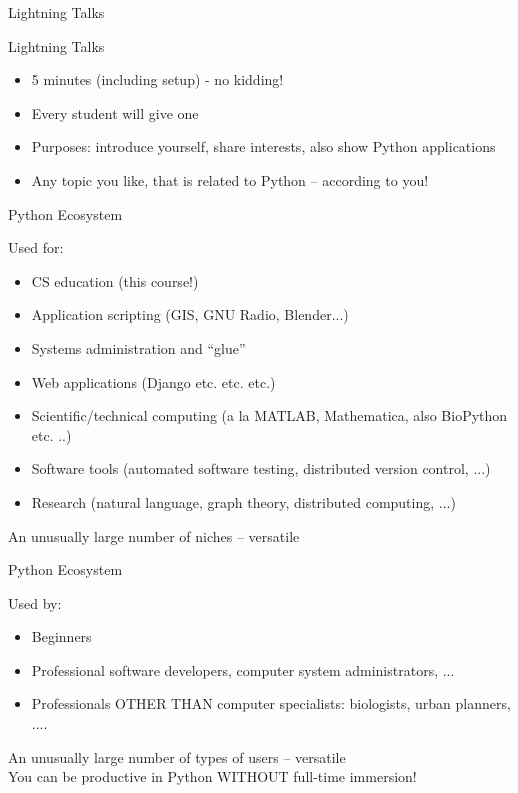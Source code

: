 \documentclass{beamer}
\begin{document}
\begin{frame}{Lightning Talks}

{\Large Lightning Talks}
\begin{itemize}
   \item 5 minutes (including setup) - no kidding!
   \item Every student will give one
   \item Purposes: introduce yourself, share interests, also show Python applications
   \item Any topic you like, that is related to Python -- according to you!
\end{itemize}
\end{frame}


\begin{frame}{Python Ecosystem}

{\Large Used for:} 
\begin{itemize}
  \item CS education (this course!)  
  \item Application scripting (GIS, GNU Radio, Blender...)
  \item Systems administration and ``glue''
  \item Web applications (Django etc. etc. etc.)
  \item Scientific/technical computing (a la MATLAB, Mathematica, also BioPython etc. ..)
  \item Software tools (automated software testing, distributed version control, ...)
  \item Research (natural language, graph theory, distributed computing, ...)
\end{itemize}

 An unusually large number of niches -- versatile
\end{frame}

\begin{frame}{Python Ecosystem}

{\Large Used by:} 
\begin{itemize}
  \item Beginners
  \item Professional software developers, computer system administrators, ...  
  \item Professionals OTHER THAN computer specialists: biologists, urban planners, ....
\end{itemize}
\vspace{0.25in}
 An unusually large number of types of users -- versatile\\[0.25in]
 You can be productive in Python WITHOUT full-time immersion!
\end{frame}
\end{document}

